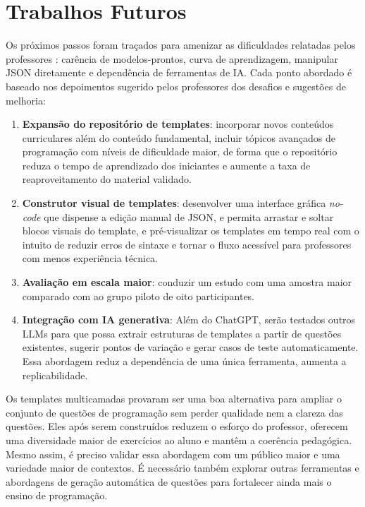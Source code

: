 \section{Trabalhos Futuros}

Os próximos passos foram traçados para amenizar as dificuldades relatadas pelos professores : carência de modelos-prontos, curva de aprendizagem, manipular JSON diretamente e dependência de ferramentas de IA. Cada ponto abordado é baseado nos depoimentos sugerido pelos professores dos desafios e sugestões de melhoria:

\begin{enumerate}
  \item \textbf{Expansão do repositório de templates}: incorporar novos conteúdos curriculares além do conteúdo fundamental, incluir tópicos avançados de programação com níveis de dificuldade maior, de forma que o repositório reduza o tempo de aprendizado dos iniciantes e aumente a taxa de reaproveitamento do material validado.
  \item \textbf{Construtor visual de templates}: desenvolver uma interface gráfica \emph{no-code} que dispense a edição manual de JSON, e permita arrastar e soltar blocos visuais do template, e pré-visualizar os templates em tempo real com o intuito de reduzir erros de sintaxe e tornar o fluxo acessível para professores com menos experiência técnica.
  \item \textbf{Avaliação em escala maior}: conduzir um estudo com uma amostra maior comparado com ao grupo piloto de oito participantes.
  \item \textbf{Integração com IA generativa}:
  Além do ChatGPT, serão testados outros LLMs para que possa extrair estruturas de templates a partir de questões existentes, sugerir pontos de variação e gerar casos de teste automaticamente. Essa abordagem reduz a dependência de uma única ferramenta, aumenta a replicabilidade.
\end{enumerate}

Os templates multicamadas provaram ser uma boa alternativa para ampliar o conjunto de questões de programação sem perder qualidade nem a clareza das questões. Eles após serem construídos reduzem o esforço do professor, oferecem uma diversidade maior de exercícios ao aluno e mantêm a coerência pedagógica. Mesmo assim, é preciso validar essa abordagem com um público maior e uma variedade maior de contextos. É necessário também explorar outras ferramentas e abordagens de geração automática de questões para fortalecer ainda mais o ensino de programação.